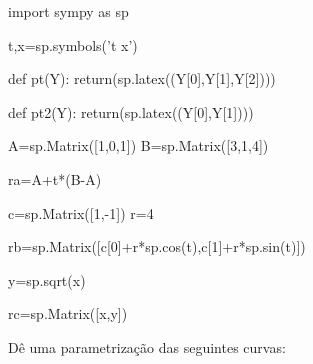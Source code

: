 \documentclass[a4paper,addpoints,12pt]{exam}
\begin{document}
\begin{questions}


\begin{pycode}
import sympy as sp

t,x=sp.symbols('t x')

def pt(Y):
 return(sp.latex((Y[0],Y[1],Y[2])))
 

def pt2(Y):
  return(sp.latex((Y[0],Y[1])))


A=sp.Matrix([1,0,1])
B=sp.Matrix([3,1,4])

ra=A+t*(B-A)

c=sp.Matrix([1,-1])
r=4

rb=sp.Matrix([c[0]+r*sp.cos(t),c[1]+r*sp.sin(t)])

y=sp.sqrt(x)

rc=sp.Matrix([x,y])
 


\end{pycode}

\question Dê uma parametrização das seguintes curvas:




\begin{solution}
\end{solution}
\end{questions}
\end{document}
